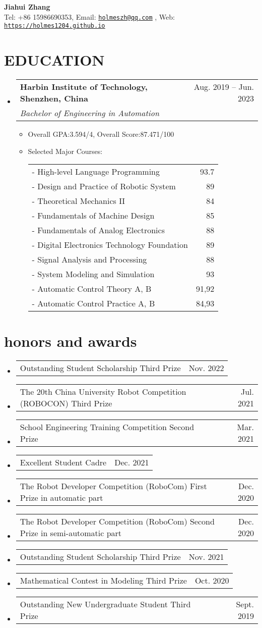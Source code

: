 \documentclass[a4paper,12pt]{article}
\makeatletter
\newcommand{\resumeItem}[1]{
  \item\small{
    {#1 \vspace{-2pt}}
  }
}
\newcommand{\resumeSubheading}[4]{
  \vspace{-2pt}\item
    \begin{tabular*}{0.97\textwidth}[t]{l@{\extracolsep{\fill}}r}
      \textbf{#1} & #2 \\
      \textit{\small#3} & \small #4 \\
    \end{tabular*}\vspace{-7pt}
}
\newcommand{\resumeProjectHeading}[2]{
    \item
    \begin{tabular*}{0.97\textwidth}{l@{\extracolsep{\fill}}r}
      \small#1 & #2 \\
    \end{tabular*}\vspace{-7pt}
}
\newcommand{\resumeSubHeadingListStart}{\begin{itemize}[leftmargin=0.15in, label={}]}
\newcommand{\resumeSubHeadingListEnd}{\end{itemize}}
\newcommand{\resumeItemListStart}{\begin{itemize}}
\newcommand{\resumeItemListEnd}{\end{itemize}\vspace{-5pt}}
\newcommand{\ScorelistBegin}{
	Selected Major Courses:\\
	\begin{tabular*}{0.7\textwidth}[t]{l@{\extracolsep{\fill}}r}
	}
\newcommand{\ScorelistEnd}{\end{tabular*}\vspace{-7pt}}
\newcommand{\Scoreitem}[2]{
	\hspace{12pt} -	#1 & #2 \\
}
\makeatother
\begin{document}
\begin{center}
    \textbf{\Huge Jiahui Zhang} \\ \vspace{5pt} 
    \normalsize{Tel: +86 15986690353, 
    	Email: \href{mailto:holmeszh@qq.com}{\tt\underline{holmeszh@qq.com}} , 
    	Web: \href{https://holmes1204.github.io}{\underline{\tt{https://holmes1204.github.io}}}}\\ 
    	\vspace{3pt} 
\end{center}


\section{EDUCATION}
  \resumeSubHeadingListStart
    \resumeSubheading
      {Harbin Institute of Technology, Shenzhen, China}{Aug. 2019 -- Jun. 2023}
      {Bachelor of Engineering in Automation}{}
	\resumeItemListStart
		\resumeItem{Overall GPA:3.594/4, Overall Score:87.471/100}
		\item \ScorelistBegin
			\Scoreitem{High-level Language Programming}{93.7}
			\Scoreitem{Design and Practice of Robotic System}{89}
			\Scoreitem{Theoretical Mechanics II}{84}
			\Scoreitem{Fundamentals of Machine Design}{85}
			\Scoreitem{Fundamentals of Analog Electronics}{88}
			\Scoreitem{Digital Electronics Technology Foundation}{89}
			\Scoreitem{Signal Analysis and Processing}{88}
			\Scoreitem{System Modeling and Simulation}{93}
			\Scoreitem{Automatic Control Theory A, B}{91,92}
			\Scoreitem{Automatic Control Practice A, B}{84,93}
			\ScorelistEnd
		\resumeItemListEnd
  \resumeSubHeadingListEnd


\section{honors and awards}
\resumeSubHeadingListStart
	\resumeProjectHeading
	{Outstanding Student Scholarship Third Prize}{Nov. 2022}
	\resumeProjectHeading
	{The 20th China University Robot Competition (ROBOCON) Third Prize}{Jul. 2021}
	\resumeProjectHeading
	{School Engineering Training Competition  Second Prize}{Mar. 2021}
	\resumeProjectHeading
	{Excellent Student Cadre}{Dec. 2021}
	\resumeProjectHeading
	{The Robot Developer Competition (RoboCom) First Prize in automatic part}{Dec.  2020}
	\resumeProjectHeading
	{The Robot Developer Competition (RoboCom) Second Prize in semi-automatic part}{Dec. 2020}
	\resumeProjectHeading
	{Outstanding Student Scholarship Third Prize}{Nov. 2021}
	\resumeProjectHeading
	{Mathematical Contest in Modeling Third Prize}{Oct. 2020}
	\resumeProjectHeading
	{Outstanding New Undergraduate Student Third Prize}{Sept. 2019}
\resumeSubHeadingListEnd
\end{document}
